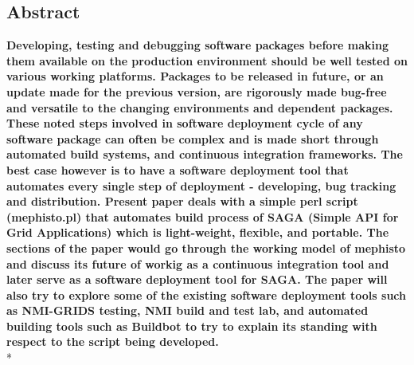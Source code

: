 \documentclass[a4paper,10pt]{article}
\begin{document}
\begin{multicols}{2}
\section*{\normalsize \textbf{Abstract}}
\textbf{Developing, testing and debugging software packages before making them available on the production environment should be well 
tested on various working platforms. Packages to be released in future, or an update made for the previous version, are rigorously
made bug-free and versatile to the changing environments and dependent packages. These noted steps involved in software deployment cycle of 
any software package can often be complex and is made short through automated build systems, and continuous integration frameworks. 
The best case however is to have a software deployment tool that automates every single step of deployment - developing, bug tracking and distribution. 
Present paper deals with a simple perl script (mephisto.pl) that automates build process of SAGA (Simple API for Grid Applications) which is 
light-weight, flexible, and portable. The sections of the paper would go through the working model of mephisto and 
discuss its future of workig as a continuous integration tool and later serve as a software deployment tool for SAGA. 
The paper will also try to explore some of the existing software deployment tools such as NMI-GRIDS testing, NMI build and test lab, 
and automated building tools such as Buildbot to try to explain its standing with respect to the script being developed. 
}\\*

\end{multicols}
\end{document}
